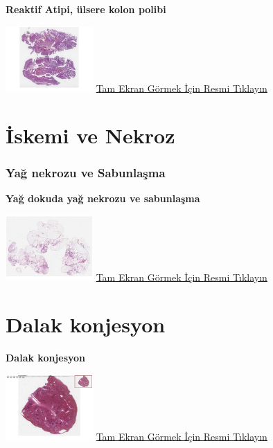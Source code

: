 \documentclass[
  letterpaper,
  DIV=11,
  numbers=noendperiod]{scrreprt}
\begin{document}
\textbf{Reaktif Atipi, ülsere kolon polibi}

\href{https://images.patolojiatlasi.com/reactive-atypia/HE.html}{\includegraphics[width=0.25\textwidth,height=\textheight]{./screenshots/reactive-atypia_screenshot.png}}
\href{https://images.patolojiatlasi.com/reactive-atypia/HE.html}{Tam
Ekran Görmek İçin Resmi Tıklayın}

\hypertarget{sec-iskemi-ve-nekroz}{%
\chapter{İskemi ve Nekroz}\label{sec-iskemi-ve-nekroz}}

\hypertarget{sec-yag-nekrozu-sabunlasma}{%
\subsection{Yağ nekrozu ve
Sabunlaşma}\label{sec-yag-nekrozu-sabunlasma}}

\textbf{Yağ dokuda yağ nekrozu ve sabunlaşma}

\href{https://images.patolojiatlasi.com/fat-necrosis/HE.html}{\includegraphics[width=0.25\textwidth,height=\textheight]{./screenshots/fat-necrosis_screenshot.png}}
\href{https://images.patolojiatlasi.com/fat-necrosis/HE.html}{Tam Ekran
Görmek İçin Resmi Tıklayın}

\hypertarget{sec-congestion-spleen}{%
\chapter{Dalak konjesyon}\label{sec-congestion-spleen}}

\textbf{Dalak konjesyon}

\href{https://images.patolojiatlasi.com/congestion-spleen/HE.html}{\includegraphics[width=0.25\textwidth,height=\textheight]{./screenshots/congestion-spleen_screenshot.png}}
\href{https://images.patolojiatlasi.com/congestion-spleen/HE.html}{Tam
Ekran Görmek İçin Resmi Tıklayın}
\end{document}
